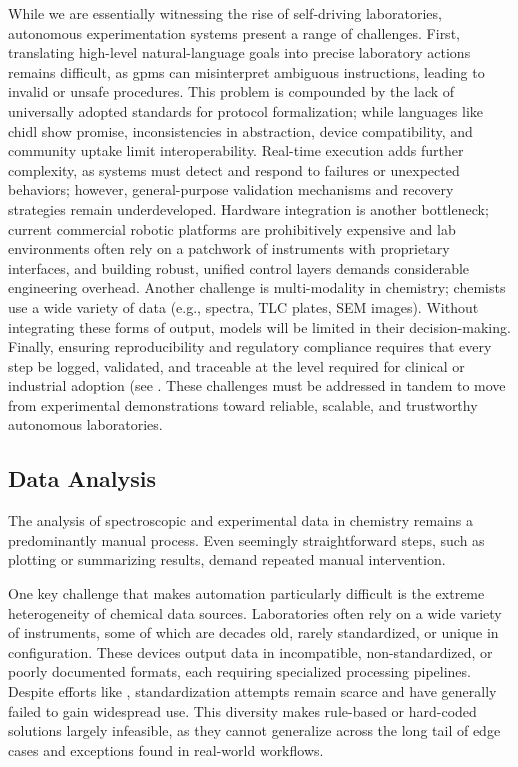 While we are essentially witnessing the rise of self-driving laboratories, autonomous experimentation systems present a range of challenges.\autocite{Tom2024SDL,Seifrid2022SDL} 
First, translating high-level natural-language goals into precise laboratory actions remains difficult, as \glspl{gpm} can misinterpret ambiguous instructions, leading to invalid or unsafe procedures. 
This problem is compounded by the lack of universally adopted standards for protocol formalization; while languages like \gls{chidl} show promise, inconsistencies in abstraction, device compatibility, and community uptake limit interoperability. 
Real-time execution adds further complexity, as systems must detect and respond to failures or unexpected behaviors; however, general-purpose validation mechanisms and recovery strategies remain underdeveloped. 
Hardware integration is another bottleneck; current commercial robotic platforms are prohibitively expensive and lab environments often rely on a patchwork of instruments with proprietary interfaces, and building robust, unified control layers demands considerable engineering overhead. 
Another challenge is multi-modality in chemistry; chemists use a wide variety of data (e.g., spectra, TLC plates, SEM images). 
Without integrating these forms of output, models will be limited in their decision-making. 
Finally, ensuring reproducibility and regulatory compliance requires that every step be logged, validated, and traceable at the level required for clinical or industrial adoption (see . These challenges must be addressed in tandem to move from experimental demonstrations toward reliable, scalable, and trustworthy autonomous laboratories.


\subsection{Data Analysis}
The analysis of spectroscopic and experimental data in chemistry remains a predominantly manual process. 
Even seemingly straightforward steps, such as plotting or summarizing results, demand repeated manual intervention.

One key challenge that makes automation particularly difficult is the extreme heterogeneity of chemical data sources. 
Laboratories often rely on a wide variety of instruments, some of which are decades old, rarely standardized, or unique in configuration.\autocite{jablonka2022making} 
These devices output data in incompatible, non-standardized, or poorly documented formats, each requiring specialized processing pipelines. 
Despite efforts like  \autocite{McDonald1988standard}, standardization attempts remain scarce and have generally failed to gain widespread use. 
This diversity makes rule-based or hard-coded solutions largely infeasible, as they cannot generalize across the long tail of edge cases and exceptions found in real-world workflows.

